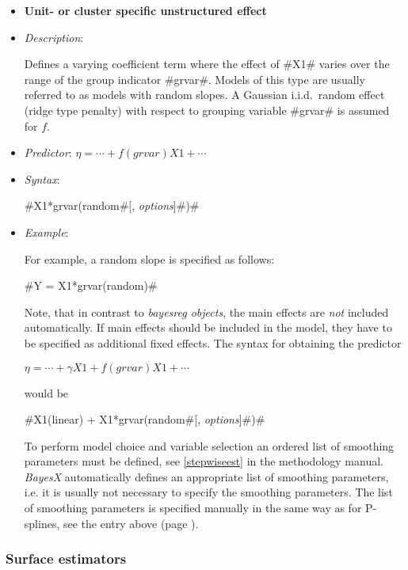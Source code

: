 \begin{itemize}
\item[]{\bf\sffamily Unit- or cluster specific unstructured
effect}

\item[] {\em Description}:

Defines a varying coefficient term where the effect of #X1# varies over the range of the group indicator #grvar#. Models of
this type are usually referred to as models with random slopes. A Gaussian i.i.d.~random effect (ridge type penalty)  with
respect to grouping variable #grvar# is assumed for $f$.
\item[] {\em Predictor}: $\eta = \cdots + f(grvar)X1 + \cdots$
\item[] {\em Syntax}:

#X1*grvar(random#[, {\em options}]#)#
\item[] {\em Example}:

For example, a random slope is specified as follows:

#Y = X1*grvar(random)#

Note, that in contrast to {\em bayesreg objects}, the main effects
are {\em not} included automatically. If main effects should be
included in the model, they have to be specified as additional
fixed effects. The syntax for obtaining the predictor

$\eta = \cdots + \gamma X1 + f(grvar)X1 + \cdots$

would be

#X1(linear) + X1*grvar(random#[, {\em options}]#)#

To perform model choice and variable selection an ordered list of smoothing parameters must be defined, see
\autoref{stepwiseest} in the methodology manual. {\em BayesX} automatically defines an appropriate list of smoothing
parameters, i.e. it is usually not necessary to  specify the smoothing parameters. The list of smoothing parameters is
specified manually in the same way as for P-splines, see the entry above (page \pageref{psplines_stepwise}).
\end{itemize}

\subsubsection*{Surface estimators}

